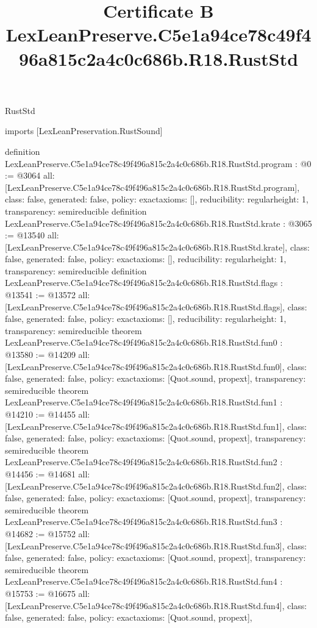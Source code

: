 \begin{lexlean}{RustStd}
\title{Certificate B LexLeanPreserve.C5e1a94ce78c49f496a815c2a4c0c686b.R18.RustStd}
\begin{coremodule}
imports [LexLeanPreservation.RustSound]

definition LexLeanPreserve.C5e1a94ce78c49f496a815c2a4c0c686b.R18.RustStd.program : @0 := @3064 {
  all: [LexLeanPreserve.C5e1a94ce78c49f496a815c2a4c0c686b.R18.RustStd.program],
  class: false,
  generated: false,
  policy: exact{axioms: []},
  reducibility: regular{height: 1},
  transparency: semireducible
}
definition LexLeanPreserve.C5e1a94ce78c49f496a815c2a4c0c686b.R18.RustStd.krate : @3065 := @13540 {
  all: [LexLeanPreserve.C5e1a94ce78c49f496a815c2a4c0c686b.R18.RustStd.krate],
  class: false,
  generated: false,
  policy: exact{axioms: []},
  reducibility: regular{height: 1},
  transparency: semireducible
}
definition LexLeanPreserve.C5e1a94ce78c49f496a815c2a4c0c686b.R18.RustStd.flags : @13541 := @13572 {
  all: [LexLeanPreserve.C5e1a94ce78c49f496a815c2a4c0c686b.R18.RustStd.flags],
  class: false,
  generated: false,
  policy: exact{axioms: []},
  reducibility: regular{height: 1},
  transparency: semireducible
}
theorem LexLeanPreserve.C5e1a94ce78c49f496a815c2a4c0c686b.R18.RustStd.fun0 : @13580 := @14209 {
  all: [LexLeanPreserve.C5e1a94ce78c49f496a815c2a4c0c686b.R18.RustStd.fun0],
  class: false,
  generated: false,
  policy: exact{axioms: [Quot.sound, propext]},
  transparency: semireducible
}
theorem LexLeanPreserve.C5e1a94ce78c49f496a815c2a4c0c686b.R18.RustStd.fun1 : @14210 := @14455 {
  all: [LexLeanPreserve.C5e1a94ce78c49f496a815c2a4c0c686b.R18.RustStd.fun1],
  class: false,
  generated: false,
  policy: exact{axioms: [Quot.sound, propext]},
  transparency: semireducible
}
theorem LexLeanPreserve.C5e1a94ce78c49f496a815c2a4c0c686b.R18.RustStd.fun2 : @14456 := @14681 {
  all: [LexLeanPreserve.C5e1a94ce78c49f496a815c2a4c0c686b.R18.RustStd.fun2],
  class: false,
  generated: false,
  policy: exact{axioms: [Quot.sound, propext]},
  transparency: semireducible
}
theorem LexLeanPreserve.C5e1a94ce78c49f496a815c2a4c0c686b.R18.RustStd.fun3 : @14682 := @15752 {
  all: [LexLeanPreserve.C5e1a94ce78c49f496a815c2a4c0c686b.R18.RustStd.fun3],
  class: false,
  generated: false,
  policy: exact{axioms: [Quot.sound, propext]},
  transparency: semireducible
}
theorem LexLeanPreserve.C5e1a94ce78c49f496a815c2a4c0c686b.R18.RustStd.fun4 : @15753 := @16675 {
  all: [LexLeanPreserve.C5e1a94ce78c49f496a815c2a4c0c686b.R18.RustStd.fun4],
  class: false,
  generated: false,
  policy: exact{axioms: [Quot.sound, propext]},
}
\end{coremodule}
\end{lexlean}
